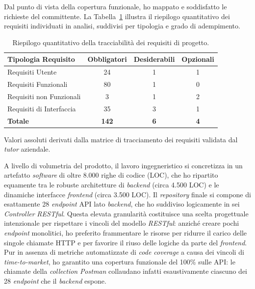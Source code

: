 Dal punto di vista della copertura funzionale, ho mappato e soddisfatto le richieste del committente. La Tabella~\ref{tab:riepilogo_requisiti} illustra il riepilogo quantitativo dei requisiti individuati in analisi, suddivisi per tipologia e grado di adempimento.

\begin{table}[H]
    \centering
    \begin{tabular}{p{} c c c}
        \hline
        \textbf{Tipologia Requisito} & \textbf{Obbligatori} & \textbf{Desiderabili} & \textbf{Opzionali} \\
        \hline
        Requisiti Utente & 24 & 1 & 1 \\
        Requisiti Funzionali & 80 & 1 & 0 \\
        Requisiti non Funzionali & 3 & 1 & 2 \\
        Requisiti di Interfaccia & 35 & 3 & 1 \\
        \hline
        \textbf{Totale} & \textbf{142} & \textbf{6} & \textbf{4} \\
        \hline
    \end{tabular}
    \caption{Riepilogo quantitativo della tracciabilità dei requisiti di progetto.}
    \vspace{0.1cm}
    {\footnotesize Valori assoluti derivati dalla matrice di tracciamento dei requisiti validata dal \textit{tutor} aziendale.\par}
    \label{tab:riepilogo_requisiti}
\end{table}

A livello di volumetria del prodotto, il lavoro ingegneristico si concretizza in un artefatto \textit{software} di oltre 8.000 righe di codice (LOC), che ho ripartito equamente tra le robuste architetture di \textit{backend} (circa 4.500 LOC) e le dinamiche interfacce \textit{frontend} (circa 3.500 LOC). Il \textit{repository} finale si compone di esattamente 28 \textit{endpoint} API lato \textit{backend}, che ho suddiviso logicamente in sei \textit{Controller} \textit{RESTful}. Questa elevata granularità costituisce una scelta progettuale intenzionale per rispettare i vincoli del modello \textit{RESTful}: anziché creare pochi \textit{endpoint} monolitici, ho preferito frammentare le risorse per ridurre il carico delle singole chiamate HTTP e per favorire il riuso delle logiche da parte del \textit{frontend}. Pur in assenza di metriche automatizzate di \textit{code coverage} a causa dei vincoli di \textit{time-to-market}, ho garantito una copertura funzionale del 100\% sulle API: le chiamate della \textit{collection} \textit{Postman} collaudano infatti esaustivamente ciascuno dei 28 \textit{endpoint} che il \textit{backend} espone.

